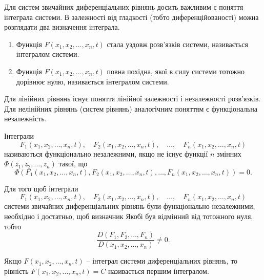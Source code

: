 Для систем звичайних диференціальних рівнянь досить важливим є поняття інтеграла системи. В залежності від гладкості (тобто диференційованості) можна розглядати два визначення інтеграла.

\begin{definition}
	\begin{enumerate}
		\item Функція $F(x_1, x_2, \ldots, x_n, t)$ стала уздовж розв'язків системи, називається інтегралом системи.
		\item Функція $F(x_1, x_2, \ldots, x_n, t)$ повна похідна, якої в силу системи тотожно дорівнює нулю, називається інтегралом системи.
	\end{enumerate}
\end{definition}

Для лінійних рівнянь існує поняття лінійної залежності і незалежності розв'язків. Для нелінійних рівнянь (систем рівнянь) аналогічним поняттям є функціональна незалежність.

\begin{definition}
	Інтеграли 
	\begin{equation*}
		F_1(x_1, x_2, \ldots, x_n, t), \quad F_2(x_1, x_2, \ldots, x_n, t), \quad \ldots, \quad F_n(x_1, x_2, \ldots, x_n, t)
	\end{equation*}
	називаються функціонально незалежними, якщо не існує функції $n$ змінних $\Phi(z_1, z_2, \ldots, z_n)$ такої, що
	\begin{equation*}
		\Phi(F_1(x_1, x_2, \ldots, x_n, t), F_2(x_1, x_2, \ldots, x_n, t), \ldots, F_n(x_1, x_2, \ldots, x_n, t)) = 0.
	\end{equation*}
\end{definition}

\begin{theorem}
	Для того щоб інтеграли 
	\begin{equation*}
		F_1(x_1, x_2, \ldots, x_n, t), \quad F_2(x_1, x_2, \ldots, x_n, t), \quad \ldots, \quad F_n(x_1, x_2, \ldots, x_n, t)
	\end{equation*}
	системи звичайних диференціальних рівнянь були функціонально незалежними, необхідно і достатньо, щоб визначник Якобі був відмінний від тотожного нуля, тобто 
	\begin{equation*}
		\frac{D(F_1, F_2, \ldots, F_n)}{D(x_1, x_2, \ldots, x_n)} \ne 0.
	\end{equation*}
\end{theorem}

\begin{definition}
	Якщо $F(x_1, x_2, \ldots, x_n, t)$ -- інтеграл системи диференціальних рівнянь, то рівність $F(x_1, x_2, \ldots, x_n, t) = C$ називається першим інтегралом.
\end{definition}

